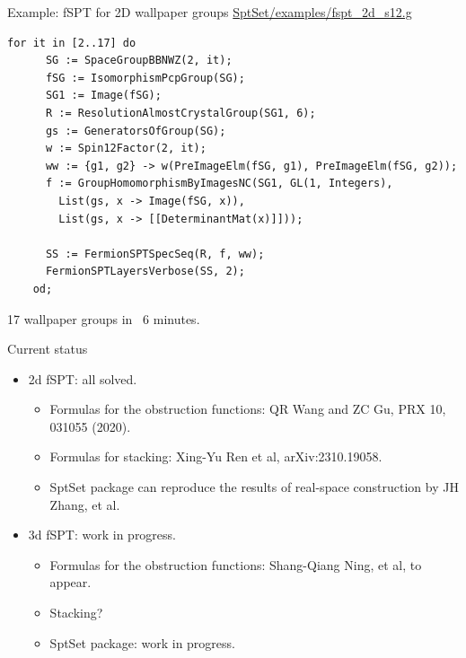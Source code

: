 \documentclass[xcolor=table, 11pt, aspectratio=169]{beamer}
\begin{document}
\begin{frame}[fragile]{Example: fSPT for 2D wallpaper groups}
	\url{SptSet/examples/fspt_2d_s12.g}
	\begin{lstlisting}[basicstyle=\footnotesize]
    for it in [2..17] do
      SG := SpaceGroupBBNWZ(2, it);
      fSG := IsomorphismPcpGroup(SG);
      SG1 := Image(fSG);
      R := ResolutionAlmostCrystalGroup(SG1, 6);
      gs := GeneratorsOfGroup(SG);
      w := Spin12Factor(2, it);
      ww := {g1, g2} -> w(PreImageElm(fSG, g1), PreImageElm(fSG, g2));
      f := GroupHomomorphismByImagesNC(SG1, GL(1, Integers),
        List(gs, x -> Image(fSG, x)),
        List(gs, x -> [[DeterminantMat(x)]]));

      SS := FermionSPTSpecSeq(R, f, ww);
      FermionSPTLayersVerbose(SS, 2);
    od;
  \end{lstlisting}
  17 wallpaper groups in ~6 minutes.
\end{frame}

\begin{frame}{Current status}
  \begin{itemize}
    \item 2d fSPT: all solved.
    \begin{itemize}
      \item Formulas for the obstruction functions: QR Wang and ZC Gu, PRX 10, 031055 (2020).
      \item Formulas for stacking: Xing-Yu Ren et al, arXiv:2310.19058.
      \item SptSet package can reproduce the results of real-space construction by JH Zhang, et al.
    \end{itemize}
    \item 3d fSPT: work in progress.
    \begin{itemize}
      \item Formulas for the obstruction functions: Shang-Qiang Ning, et al, to appear.
      \item Stacking?
      \item SptSet package: work in progress.
    \end{itemize}
  \end{itemize}
\end{frame}
\end{document}
